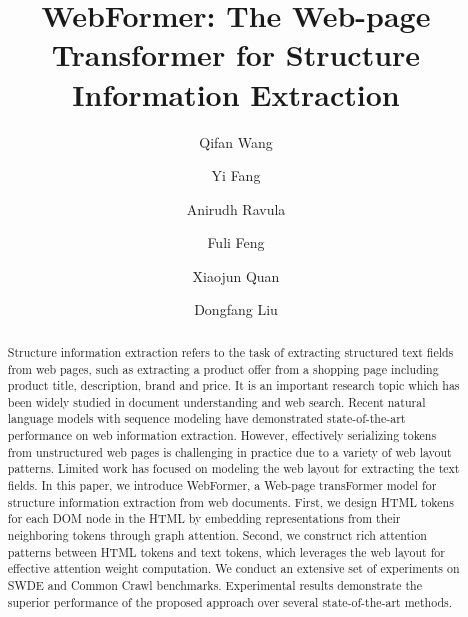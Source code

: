 \documentclass[sigconf]{acmart}
\begin{document}
\sloppy{}
\title{WebFormer: The Web-page Transformer for Structure Information Extraction}
\author{Qifan Wang}

\author{Yi Fang}

\author{Anirudh	Ravula}

\author{Fuli Feng}

\author{Xiaojun	Quan}

\author{Dongfang Liu}
\authornotemark[1]
\begin{abstract}
Structure information extraction refers to the task of extracting structured text fields from web pages, such as extracting a product offer from a shopping page including product title, description, brand and price. It is an important research topic which has been widely studied in document understanding and web search. Recent natural language models with sequence modeling have demonstrated state-of-the-art performance on web information extraction. However, effectively serializing tokens from unstructured web pages is challenging in practice due to a variety of web layout patterns. Limited work has focused on modeling the web layout for extracting the text fields.
In this paper, we introduce WebFormer, a Web-page transFormer model for structure information extraction from web documents. First, we design HTML tokens for each DOM node in the HTML by embedding representations from their neighboring tokens through graph attention. Second, we construct rich attention patterns between HTML tokens and text tokens, which leverages the web layout for effective attention weight computation.
We conduct an extensive set of experiments on SWDE and Common Crawl benchmarks. Experimental results demonstrate the superior performance of the proposed approach over several state-of-the-art methods.
\end{abstract}
\end{document}
